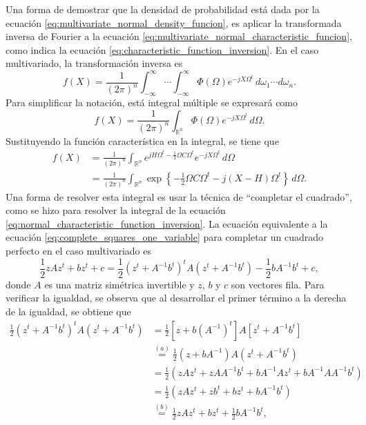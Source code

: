 \documentclass[a4paper]{report}
\begin{document}
Una forma de demostrar que la densidad de probabilidad está dada por la ecuación \ref{eq:multivariate_normal_density_funcion}, es aplicar la transformada inversa de Fourier a la ecuación \ref{eq:multivariate_normal_characteristic_funcion}, como indica la ecuación \ref{eq:characteristic_function_inversion}. En el caso multivariado, la transformación inversa es
\[
 f(X)=\frac{1}{(2\pi)^n}\int_{-\infty}^{\infty}\cdots\int_{-\infty}^{\infty}\Phi(\Omega)e^{-jX\Omega^t}\,d\omega_1\cdots d\omega_n.
\]
Para simplificar la notación, está integral múltiple se expresará como
\[
 f(X)=\frac{1}{(2\pi)^n}\int_{{\mathbb{R}^n}}\Phi(\Omega)e^{-jX\Omega^t}\,d\Omega.
\]
Sustituyendo la función característica en la integral, se tiene que
\begin{align}\label{eq:multivariate_normal_density_funcion_tmp1}
 f(X)&=\frac{1}{(2\pi)^n}\int_{{\mathbb{R}^n}}e^{jH\Omega ^t-\frac{1}{2}\Omega C\Omega^t}e^{-jX\Omega^t}\,d\Omega\nonumber\\
  &=\frac{1}{(2\pi)^n}\int_{{\mathbb{R}^n}}\exp\left\{-\frac{1}{2}\Omega C\Omega^t-j(X-H)\Omega^t\right\}\,d\Omega.
\end{align}
Una forma de resolver esta integral es usar la técnica de ``completar el cuadrado'', como se hizo para resolver la integral de la ecuación \ref{eq:normal_characteristic_function_inversion}. La ecuación equivalente a la ecuación \ref{eq:complete_squares_one_variable} para completar un cuadrado perfecto en el caso multivariado es \cite{do2008more}
\begin{equation}\label{eq:complete_squares_multivariate}
 \frac{1}{2}zAz^t+bz^t+c=\frac{1}{2}\left(z^t+A^{-1}b^t\right)^tA\left(z^t+A^{-1}b^t\right)-\frac{1}{2}bA^{-1}b^t+c,
\end{equation}
donde \(A\) es una matriz simétrica invertible y \(z\), \(b\) y \(c\) son vectores fila. Para verificar la igualdad, se observa que al desarrollar el primer término a la derecha de la igualdad, se obtiene que
\begin{align*}
 \frac{1}{2}\left(z^t+A^{-1}b^t\right)^tA\left(z^t+A^{-1}b^t\right)&=
      \frac{1}{2}\left[z+b\left(A^{-1}\right)^t\right]A\left[z^t+A^{-1}b^t\right]\\
  &\overset{(a)}{=}\frac{1}{2}\left(z+bA^{-1}\right)A\left(z^t+A^{-1}b^t\right)\\
  &=\frac{1}{2}\left(zAz^t+zAA^{-1}b^t+bA^{-1}Az^t+bA^{-1}AA^{-1}b^t\right)\\
  &=\frac{1}{2}\left(zAz^t+zb^t+bz^t+bA^{-1}b^t\right)\\
  &\overset{(b)}{=}\frac{1}{2}zAz^t+bz^t+\frac{1}{2}bA^{-1}b^t,
\end{align*}
\end{document}
